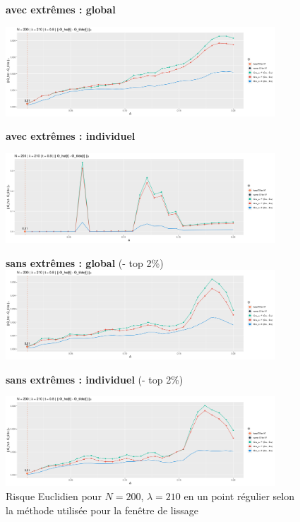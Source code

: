 \begin{figure}[H]
	\centering

	\textbf{avec extrêmes : global}

	\includegraphics[width=0.9\textwidth]{Images/indiv_glob_img/compare/210_regular/all_glob.jpg}

	\textbf{avec extrêmes : individuel}

	\includegraphics[width=0.9\textwidth]{Images/indiv_glob_img/compare/210_regular/all.jpg}

	\textbf{sans extrêmes : global} (- top 2\%)
	\includegraphics[width=0.9\textwidth]{Images/indiv_glob_img/compare/210_regular/no_xtrm_glob.jpg}

	\textbf{sans extrêmes : individuel} (- top 2\%)

	\includegraphics[width=0.9\textwidth]{Images/indiv_glob_img/compare/210_regular/no_xtrm.jpg}


	\caption{Risque Euclidien pour $N=200$, $\lambda=210$ en un point régulier selon la méthode utilisée pour la fenêtre de lissage}
	\label{fig:compare_xtrm_2}
\end{figure}


